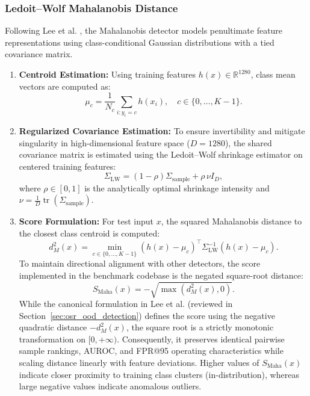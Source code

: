 \subsubsection{Ledoit--Wolf Mahalanobis Distance}
Following Lee et al. \cite{lee2018simple}, the Mahalanobis detector models penultimate feature representations using class-conditional Gaussian distributions with a tied covariance matrix.
\begin{enumerate}
\item \textbf{Centroid Estimation:} Using training features $h(x) \in \mathbb{R}^{1280}$, class mean vectors are computed as:
\begin{equation}
\mu_c = \frac{1}{N_c} \sum_{i : y_i = c} h(x_i), \quad c \in \{0, \dots, K-1\}.
\end{equation}
\item \textbf{Regularized Covariance Estimation:} To ensure invertibility and mitigate singularity in high-dimensional feature space ($D = 1280$), the shared covariance matrix is estimated using the Ledoit--Wolf shrinkage estimator on centered training features:
\begin{equation}
\Sigma_{\text{LW}} = (1 - \rho) \Sigma_{\text{sample}} + \rho \, \nu I_D,
\end{equation}
where $\rho \in [0, 1]$ is the analytically optimal shrinkage intensity and $\nu = \frac{1}{D} \operatorname{tr}(\Sigma_{\text{sample}})$.
\item \textbf{Score Formulation:} For test input $x$, the squared Mahalanobis distance to the closest class centroid is computed:
\begin{equation}
d_M^2(x) = \min_{c \in \{0, \dots, K-1\}} (h(x) - \mu_c)^\top \Sigma_{\text{LW}}^{-1} (h(x) - \mu_c).
\end{equation}
To maintain directional alignment with other detectors, the score implemented in the benchmark codebase is the negated square-root distance:
\begin{equation}
S_{\text{Maha}}(x) = - \sqrt{\max\left(d_M^2(x), 0\right)}.
\end{equation}
While the canonical formulation in Lee et al. \cite{lee2018simple} (reviewed in Section~\ref{sec:osr_ood_detection}) defines the score using the negative quadratic distance $-d_M^2(x)$, the square root is a strictly monotonic transformation on $[0, +\infty)$. Consequently, it preserves identical pairwise sample rankings, AUROC, and FPR@95 operating characteristics while scaling distance linearly with feature deviations. Higher values of $S_{\text{Maha}}(x)$ indicate closer proximity to training class clusters (in-distribution), whereas large negative values indicate anomalous outliers.
\end{enumerate}

